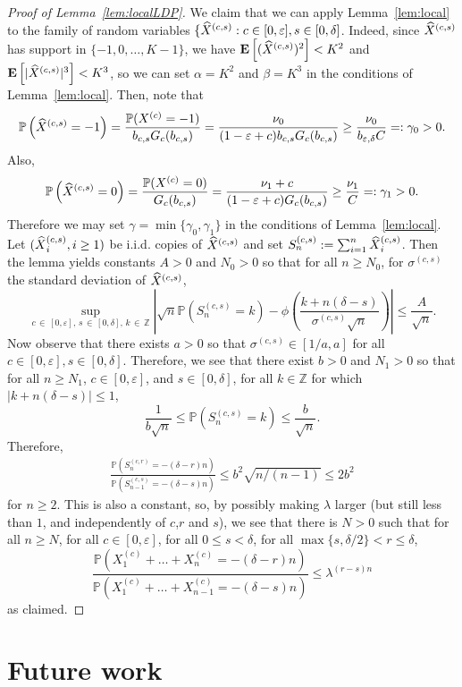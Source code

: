 \documentclass[10pt]{amsart}
\theoremstyle{definition}\newtheorem{defi}[theo]{Definition}\newtheorem{rema}[theo]{Remark}\newtheorem{exam}[theo]{Example}\newtheorem{exem}[theo]{Example}\newtheorem{nota}[theo]{Notation}
\newcommand{\Z}{\mathbb{Z}}
\renewcommand{\P}{\mathbb{P}}
\newcommand{\E}[1]{{\mathbf E}\left[#1\right]}
\let\oldhat\hat
\renewcommand*{\hat}[1]{\mathchoice{\widehat{#1}}{\widehat{#1}}{\oldhat{#1}}{\oldhat{#1}}}
\begin{document}
\begin{proof}[Proof of Lemma~\ref{lem:localLDP}]
We claim that we can apply Lemma~\ref{lem:local} to the family of random variables $\{\hat{X}^{(c,s)}:c\in [0,\varepsilon], s\in [0,\delta]$. Indeed, since $\hat{X}^{(c,s)}$ has support in $\{-1,0,\dots, K-1\}$, we have $\E{(\hat{X}^{(c,s)})^2}<K^2$ and $\E{|\hat{X}^{(c,s)}|^3}<K^3$, so we can set $\alpha=K^2$ and $\beta=K^3$ in the conditions of Lemma~\ref{lem:local}. Then, note that
\[
\P\left(\hat{X}^{(c,s)}=-1\right)=\frac{\P(X^{(c)}=-1)}{b_{c,s}G_c(b_{c,s})}=\frac{\nu_0}{ (1-\varepsilon+c)b_{c,s}G_c(b_{c,s})}\geq \frac{\nu_0}{ b_{\varepsilon,\delta} C}=:\gamma_0>0.
\]
Also,
\[
\P\left(\hat{X}^{(c,s)}=0\right)=\frac{\P(X^{(c)}=0)}{G_c(b_{c,s})}=\frac{\nu_1+c}{ (1-\varepsilon+c)G_c(b_{c,s}) }\geq \frac{\nu_1}{C}=:\gamma_1>0.
\]
Therefore we may set $\gamma=\min\{\gamma_0,\gamma_1\}$ in the conditions of Lemma~\ref{lem:local}. Let $(\hat{X}^{(c,s)}_i,i\linebreak \ge 1)$ be i.i.d. copies of $\hat{X}^{(c,s)}$ and set $S^{(c,s)}_n:=\sum_{i=1}^n \hat{X}^{(c,s)}_i$. Then the lemma yields constants $A>0$ and $N_0>0$ so that for all $n\geq N_0$, for $\sigma^{(c,s)}$ the standard deviation of $\hat{X}^{(c,s)}$,
\[
\sup_{c\,\in\,[0,\varepsilon],\,s\,\in\,[0,\delta], \,k\,\in\,\Z} \left|\sqrt{n}\P\left(S^{(c,s)}_n=k\right)-\phi\left(\frac{k+n(\delta-s)}{\sigma^{(c,s)}\sqrt{n}}\right) \right|\leq \frac{A}{\sqrt{n}}.
\]
Now observe that there exists $a>0$ so that $\sigma^{(c,s)}\in [1/a,a]$ for all $c\in [0,\varepsilon], s\in[0,\delta]$. Therefore, we see that there exist $b>0$ and $N_1>0$ so that for all $n\ge N_1$, $c\in [0,\varepsilon]$, and $s\in[0,\delta]$, for all $k\in \Z$ for which $|k+n(\delta-s)|\le 1 $,
\[
\frac{1}{b\sqrt n} \leq \P\left(S^{(c,s)}_n=k\right)\leq \frac{b}{\sqrt{n}}.
\]
Therefore,
\begin{align*}
\frac{\P\left(S^{(c,r)}_n=-(\delta-r)n\right)}{ \P\left(S^{(c,s)}_{n-1}=-(\delta-s)n\right)}\leq b^2\sqrt{n/(n-1)}\leq 2b^2
\end{align*}
for $n\geq 2$. This is also a constant, so, by possibly making $\lambda$ larger (but still less than $1$, and independently of $c$,$r$ and $s$), we see that there is $N>0$ such that for all $n \ge N$, for all $c\in [0,\varepsilon]$, for all $0\leq s<\delta$, for all $\max\{s,\delta/2\}<r\leq \delta$,
\[
\frac{\P\left(X^{(c)}_1+\dots+X^{(c)}_{n}= -(\delta-r)n\right)}{
\P\left(X^{(c)}_1+\dots+X^{(c)}_{n-1}=-(\delta-s)n\right)}\leq \lambda^{(r-s)n}
\]
as claimed.
\end{proof}


\section{Future work}\label{sec:future}
\end{document}
